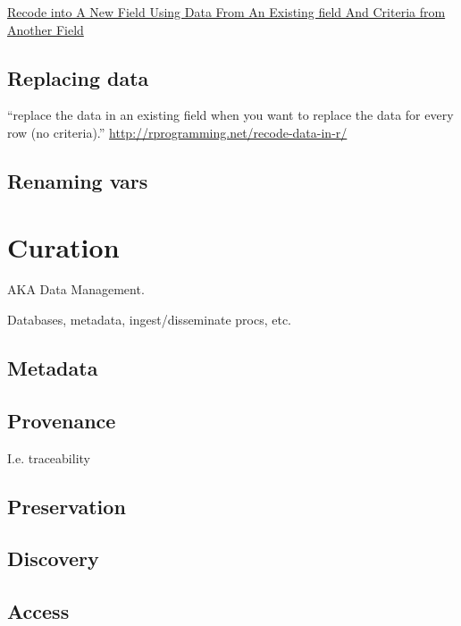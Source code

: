 \documentclass[reqno,12pt]{tufte-book}
\numberwithin{equation}{subsection}
\begin{document}
\href{http://rprogramming.net/recode-data-in-r/}{Recode into A New Field Using Data From An Existing field And Criteria from Another Field}

\section{Replacing data}
\label{sect:datareplacement}

``replace the data in an existing field when you want to replace the data for every row (no criteria).'' \url{http://rprogramming.net/recode-data-in-r/}

\section{Renaming vars}
\label{sect:renamingvars}

\chapter{Curation}

AKA Data Management.

Databases, metadata, ingest/disseminate procs, etc.

\section{Metadata}
\label{sect:datameta}

\section{Provenance}
\label{sect:dataprovenance}

I.e. traceability

\section{Preservation}
\label{sect:datapreservation}

\section{Discovery}
\label{sect:discovery}

\section{Access}
\label{sect:access}
\end{document}

